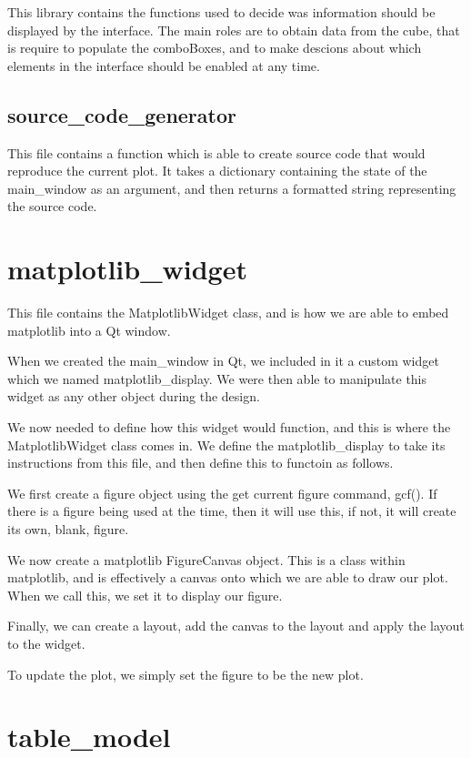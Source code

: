 \documentclass[whitecover]{MO_report}
\begin{document}
This library contains the functions used to decide was information should be
displayed by the interface. The main roles are to obtain data from the cube,
that is require to populate the comboBoxes, and to make descions about which
elements in the interface should be enabled at any time.

\subsection{source\_code\_generator}

This file contains a function which is able to create source code that would
reproduce the current plot. It takes a dictionary containing the state of the
main\_window as an argument, and then returns a formatted string representing
the source code.

\section{matplotlib\_widget}

This file contains the MatplotlibWidget class, and is how we are able to
embed matplotlib into a Qt window. 

When we created the main\_window in Qt, we included in it a custom widget
which we named matplotlib\_display. We were then able to manipulate this
widget as any other object during the design.

We now needed to define how this widget would function, and this is where the
MatplotlibWidget class comes in. We define the matplotlib\_display to take its
instructions from this file, and then define this to functoin as follows.

We first create a figure object using the get current figure command, gcf().
If there is a figure being used at the time, then it will use this, if not,
it will create its own, blank, figure.

We now create a matplotlib FigureCanvas object. This is a class within
matplotlib, and is effectively a canvas onto which we are able to draw our
plot. When we call this, we set it to display our figure.

Finally, we can create a layout, add the canvas to the layout and apply the
layout to the widget.

To update the plot, we simply set the figure to be the new plot.

\section{table\_model}
\end{document}
